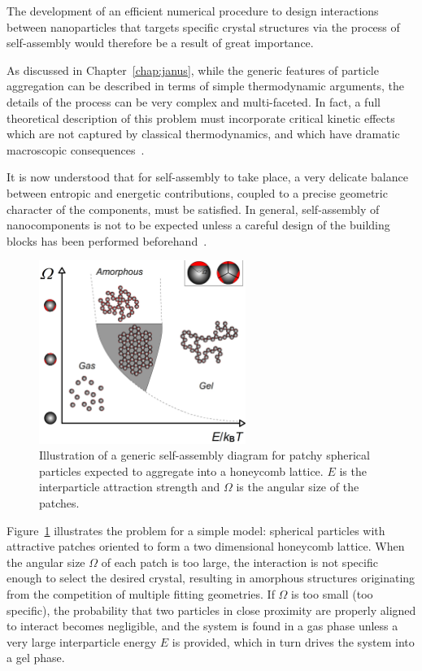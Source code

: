 The development of an efficient numerical procedure to design interactions between nanoparticles that targets specific crystal structures via the process of self-assembly would therefore be a result of great importance. 

As discussed in Chapter~\ref{chap:janus}, while the generic features of particle aggregation can be described in terms of simple thermodynamic arguments, the details of the process can be very complex and multi-faceted.
In fact, a full theoretical description of this problem must incorporate critical kinetic effects which are not captured by classical thermodynamics, and which have dramatic macroscopic consequences~\cite{chandler, cacciuto,whitelam}.
 
It is now understood that for self-assembly to take place, a very delicate balance between entropic and energetic contributions, coupled to a precise geometric character of the components, must be satisfied. 
In general, self-assembly of nanocomponents is not to be expected unless a careful design of the building blocks has been performed beforehand~\cite{chandler, cacciuto}.

\begin{figure}
	\begin{center}\includegraphics[width=0.6\textwidth]{pixel/generic.png}\end{center}
	\caption[Generic self-assembly diagram for patchy spherical particles]{Illustration of a generic self-assembly diagram for patchy spherical particles
	expected to aggregate into a honeycomb lattice. $E$ is the interparticle attraction strength and
	$\Omega$ is the angular size of the patches.}\label{patches}
\end{figure}

Figure~\ref{patches} illustrates the problem for a simple model: spherical particles with attractive patches oriented to form a two dimensional honeycomb lattice.
When the angular size $\Omega$ of each patch is too large, the interaction is not specific enough to select the desired crystal, resulting in amorphous structures originating from the competition of multiple fitting geometries.
If $\Omega$ is too small (too specific), the probability that two particles in close proximity are properly aligned to interact becomes negligible, and the system is found in a gas phase unless a very large interparticle energy $E$ is provided, which in turn drives the system into a gel  phase.

